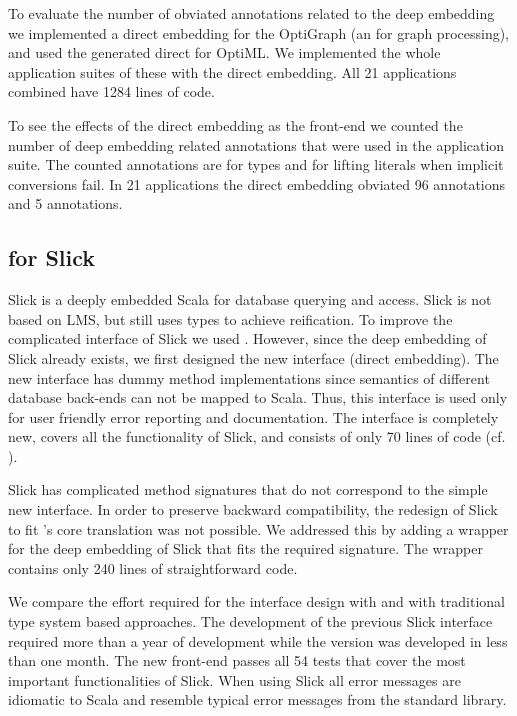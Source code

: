 To evaluate the number of obviated annotations related to the deep embedding we
implemented a direct embedding for the OptiGraph \edsl (an \edsl for graph
processing), and used the generated direct \edsl for OptiML. We implemented
the whole application suites of these \edsls with the direct embedding. All 21
applications combined have 1284 lines of code.

To see the effects of the direct embedding as the front-end we counted the
number of deep embedding related annotations that were used in the application
suite. The counted annotations are  for types and 
for lifting literals when implicit conversions fail. In 21 applications
the direct embedding obviated 96  annotations and 5
 annotations.

\subsection{\tool for Slick}
\label{subsec:slick}
Slick is a deeply embedded Scala \edsl for database querying and access. Slick
is not based on LMS, but still uses  types to achieve reification.
To improve the complicated interface of Slick we used \tool.
However, since the deep embedding of Slick already exists, we first designed the new
interface (direct embedding). The new interface has dummy method
implementations since semantics of different database back-ends can not be
mapped to Scala. Thus, this interface is used only for user friendly error reporting and
documentation. The interface is completely new, covers all the functionality of Slick,
 and consists of only 70 lines of code (cf. \cite{techrep}).

Slick has complicated method signatures that do not correspond to the simple new
interface. In order to preserve backward compatibility, the redesign of Slick to
fit \tool's core translation was not possible. We addressed this by adding a
wrapper for the deep embedding of Slick that fits the required signature.
The wrapper contains only 240 lines of straightforward code.

We compare the effort required for the interface design with \tool and with
traditional type system based approaches. The development of the previous Slick
interface required more than a year of development while the \tool version was
developed in less than one month. The new front-end passes all 54 tests that cover the
most important functionalities of Slick. When using Slick all error messages are
idiomatic to Scala and resemble typical error messages from the standard
library.

